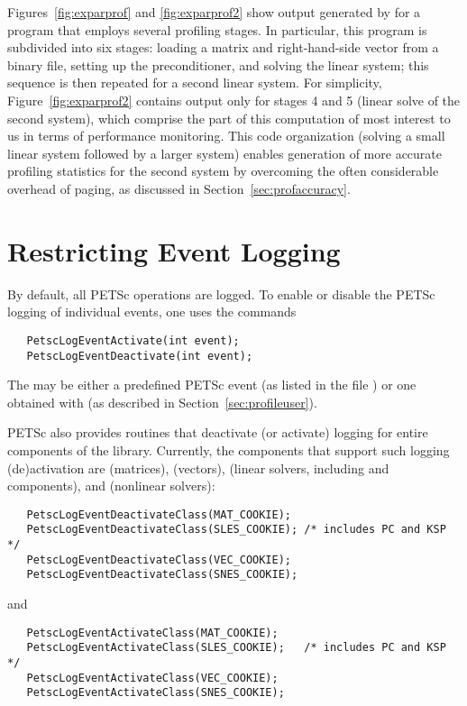 Figures~\ref{fig:exparprof} and \ref{fig:exparprof2} show output
generated by  for a program that employs
several profiling stages.  In particular, this program is
subdivided into six stages: loading a matrix and right-hand-side
vector from a binary file, setting up the preconditioner, and solving
the linear system; this sequence is then repeated for a second linear
system.  For simplicity, Figure~\ref{fig:exparprof2} contains output
only for stages 4 and 5 (linear solve of the second system), which comprise
the part of this computation of most interest to us in terms of
performance monitoring.  This code organization (solving a small
linear system followed by a larger system) enables generation of more
accurate profiling statistics for the second system by overcoming the
often considerable overhead of paging, as discussed in
Section~\ref{sec:profaccuracy}.

\section{Restricting Event Logging}
\label{sec:deactivate}

By default, all PETSc operations are logged.
To enable or disable the PETSc logging of individual events, one uses the commands
\begin{verbatim}
   PetscLogEventActivate(int event);
   PetscLogEventDeactivate(int event);
\end{verbatim}
The  may be either a predefined PETSc event (as listed in
the file ) or one obtained with
 (as described in Section~\ref{sec:profileuser}).

PETSc also provides routines that deactivate (or activate)
logging for entire components of the library. Currently, the 
components that support such logging (de)activation are  (matrices),
 (vectors),  (linear solvers, including  
and  components), and  (nonlinear solvers):
\begin{verbatim}
   PetscLogEventDeactivateClass(MAT_COOKIE);
   PetscLogEventDeactivateClass(SLES_COOKIE); /* includes PC and KSP */
   PetscLogEventDeactivateClass(VEC_COOKIE);
   PetscLogEventDeactivateClass(SNES_COOKIE);
\end{verbatim}
and 
\begin{verbatim}
   PetscLogEventActivateClass(MAT_COOKIE);
   PetscLogEventActivateClass(SLES_COOKIE);   /* includes PC and KSP */
   PetscLogEventActivateClass(VEC_COOKIE);
   PetscLogEventActivateClass(SNES_COOKIE);
\end{verbatim}

